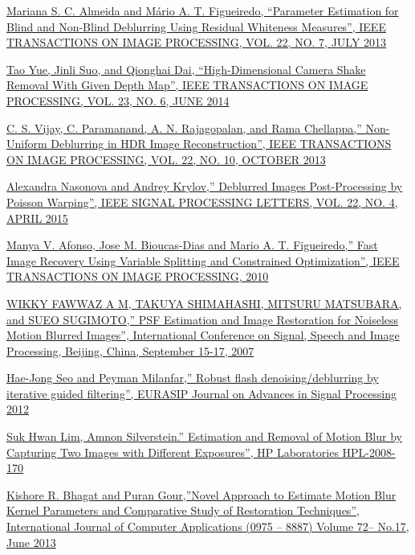 \documentclass{article}
\begin{document}
\begin{thebibliography}{9}
\href{https://ieeexplore.ieee.org/document/6497608}{Mariana S. C. Almeida and Mário A. T. Figueiredo, “Parameter Estimation for Blind and Non-Blind Deblurring Using Residual Whiteness Measures”, IEEE TRANSACTIONS ON IMAGE PROCESSING, VOL. 22, NO. 7, JULY 2013 }

\href{https://ieeexplore.ieee.org/abstract/document/6805611/}{Tao Yue, Jinli Suo, and Qionghai Dai, “High-Dimensional Camera Shake Removal With Given Depth Map”, IEEE TRANSACTIONS ON IMAGE PROCESSING, VOL. 23, NO. 6, JUNE 2014}

\href{https://ieeexplore.ieee.org/iel7/83/6587532/06497606.pdf}{C. S. Vijay, C. Paramanand, A. N. Rajagopalan, and Rama Chellappa,” Non-Uniform Deblurring in HDR Image Reconstruction”, IEEE TRANSACTIONS ON IMAGE PROCESSING, VOL. 22, NO. 10, OCTOBER 2013 }

\href{https://ieeexplore.ieee.org/document/6915685}{Alexandra Nasonova and Andrey Krylov,” Deblurred Images Post-Processing by Poisson Warping”, IEEE SIGNAL PROCESSING LETTERS, VOL. 22, NO. 4, APRIL 2015}

\href{https://ieeexplore.ieee.org/document/5445028}{Manya V. Afonso, Jose M. Bioucas-Dias and Mario A. T. Figueiredo,” Fast Image Recovery Using Variable Splitting and Constrained Optimization”, IEEE TRANSACTIONS ON IMAGE PROCESSING, 2010 }

\href{https://citeseerx.ist.psu.edu/viewdoc/download?doi=10.1.1.329.7593&rep=rep1&type=pdf}{WIKKY FAWWAZ A M, TAKUYA SHIMAHASHI, MITSURU MATSUBARA, and SUEO SUGIMOTO,” PSF Estimation and Image Restoration for Noiseless Motion Blurred Images”, International Conference on Signal, Speech and Image Processing, Beijing, China, September 15-17, 2007}

\href{https://link.springer.com/article/10.1186/1687-6180-2012-3}{Hae-Jong Seo and Peyman Milanfar,” Robust flash denoising/deblurring by iterative guided filtering”, EURASIP Journal on Advances in Signal Processing 2012}

\href{https://www.semanticscholar.org/paper/Estimation-and-Removal-of-Motion-Blur-by-Capturing-Lim-Silverstein/a598119ba16805c63f227bf4252793686f190182}{Suk Hwan Lim, Amnon Silverstein.” Estimation and Removal of Motion Blur by Capturing Two Images with Different Exposures”, HP Laboratories HPL-2008-170}

\href{https://www.ijcaonline.org/archives/volume72/number17/12634-9228}{Kishore R. Bhagat and Puran Gour,”Novel Approach to Estimate Motion Blur Kernel Parameters and Comparative Study of Restoration Techniques”, International Journal of Computer Applications (0975 – 8887) Volume 72– No.17, June 2013}


\end{thebibliography}
\end{document}
